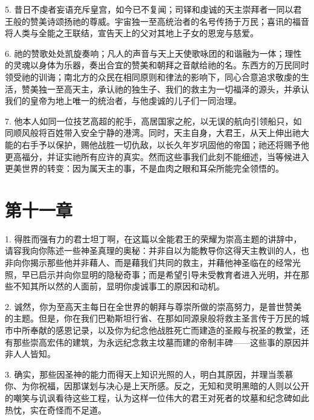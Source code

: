 5. 昔日不虔者妄语充斥皇宫，如今已不复闻；司铎和虔诚的天主崇拜者一同以君王般的赞美诗颂扬祂的尊威。宇宙独一至高统治者的名号传扬于万民；喜讯的福音将人类与全能之王联结，宣告天上的父对其地上子女的恩宠与慈爱。\par

6. 祂的赞歌处处凯旋奏响；凡人的声音与天上天使歌咏团的和谐融为一体；理性的灵魂以身体为乐器，奏出合宜的赞美和朝拜之音献给祂的名。东西方的万民同时领受祂的训诲；南北方的众民在相同原则和律法的影响下，同心合意追求敬虔的生活，赞美独一至高天主，承认祂的独生子、我们的救主为一切福泽的源头，并承认我们的皇帝为地上唯一的统治者，与他虔诚的儿子们一同治理。\par

7. 他本人如同一位技艺高超的舵手，高居国家之舵，以无误的航向引领船只，如同顺风般将百姓带入安全宁静的港湾。同时，天主自身，大君王，从天上伸出祂大能的右手予以保护，赐他战胜一切仇敌，以长久年岁巩固他的帝国；祂还将赐予他更高福分，并证实祂所有应许的真实。然而这些事我们此刻不能细述，当等候进入更美世界的转变：因为属天主的事，不是血肉之眼和耳朵所能完全领悟的。\par


\section{第十一章}

1. 得胜而强有力的君士坦丁啊，在这篇以全能君王的荣耀为崇高主题的讲辞中，请容我向你陈述一些神圣真理的奥秘：并非自以为能教导你这得天主教训的人，也非向你揭示那些他并非藉人、而是藉我们共同的救主，并藉他神圣临在的经常光照，早已启示并向你显明的隐秘奇事；而是希望引导未受教育者进入光明，并在那些不知其所以然的人面前，显明你虔诚事工的原因和动机。\par

2. 诚然，你为至高天主每日在全世界的朝拜与尊崇所做的崇高努力，是普世赞美的主题。但是，你在我们巴勒斯坦行省、在那如同源泉般将救主圣言传于万民的城市中所奉献的感恩记录，以及你为纪念他战胜死亡而建造的圣殿与祝圣的教堂，还有那些崇高宏伟的建筑，为永远纪念救主坟墓而建的帝制丰碑——这些事的原因并非人人皆知。\par

3. 确实，那些因圣神的能力而得天上知识光照的人，明白其原因，并理当羡慕你、为你祝福，因那谋划与决心是上天所感。反之，无知和灵明黑暗的人则以公开的嘲笑与讥讽看待这些工程，认为这样一位伟大的君王对死者的坟墓和纪念碑如此热忱，实在奇怪而不足道。\par

